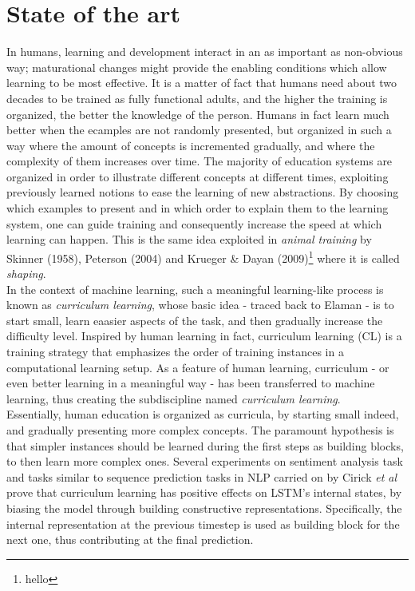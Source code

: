 \section{State of the art}
In humans, learning and development interact in an as important as non-obvious way; maturational changes might provide the enabling 
conditions which allow learning to be most effective. It is a matter of fact that humans need about two decades to be trained as fully functional 
adults, and the higher the training is organized, the better the knowledge of the person. Humans in fact learn much better when the ecamples are not randomly presented, but organized in such a way 
where the amount of concepts is incremented gradually, and where the complexity of them increases over time. The majority of education systems are organized in order to illustrate 
different concepts at different times, exploiting previously learned notions to ease the learning of new abstractions. By choosing which examples to present and in which order to explain them to the learning system, one can guide
training and consequently increase the speed at which learning can happen. This is the same idea exploited in \textit{animal training} by Skinner (1958), Peterson (2004) and Krueger \& Dayan (2009)\footnote{hello} 
where it is called \textit{shaping}. \\
In the context of machine learning, such a meaningful learning-like process is known as \textit{curriculum learning}, whose basic idea - traced back to Elaman - is to start small, learn eaasier aspects
of the task, and then gradually increase the difficulty level.
Inspired by human learning in fact, curriculum learning (CL) is a training strategy that emphasizes
the order of training instances in a computational learning setup.
As a feature of human learning, curriculum - or even better learning in a meaningful way -
has been transferred to machine learning, thus creating the subdiscipline named
\textit{curriculum learning}.\\
Essentially, human education is organized as curricula, by starting small indeed, and gradually presenting more complex
concepts. The paramount hypothesis is that simpler instances should be learned
during the first steps as building blocks, to then learn more complex ones. Several experiments on sentiment 
analysis task and tasks similar to sequence prediction tasks in NLP carried on by Cirick \textit{et al} \cite{Cirik2016VisualizingAU} prove that
curriculum learning has positive effects on LSTM's internal states, by biasing the model through building constructive representations. 
Specifically, the internal representation at the previous timestep is used as building block for the next one, thus
contributing at the final prediction.



